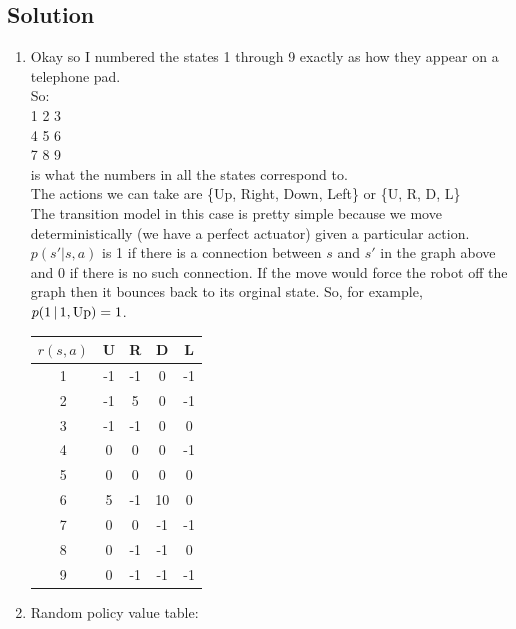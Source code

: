 \documentclass[submit]{harvardml}
\begin{document}
\subsection*{Solution}
\begin{enumerate}
\item 
Okay so I numbered the states 1 through 9 exactly as how they appear on a telephone pad.  \\
So: \\
1 2 3\\
4 5 6 \\
7 8 9 \\
is what the numbers in all the states correspond to.  \\
The actions we can take are \{Up, Right, Down, Left\} or \{U, R, D, L\} \\
The transition model in this case is pretty simple because we move deterministically (we have a perfect actuator) given a particular action. 
$p(s'|s,a)$ is 1 if there is a connection between $s$ and $s'$ in the graph above and 0 if there is no such connection.  If the move would force the robot off the graph then it bounces back to its orginal state. So, for example, $p(1 \,|\, 1, \textup{Up}) = 1$. \\
\begin{tabular}{c|c|c|c|c}
	$r(s,a)$ & U & R & D & L \\
	\hline
	1 & -1 & -1 &  0 & -1 \\
	2 & -1 &  5 &  0 & -1 \\
	3 & -1 & -1 &  0 &  0 \\
	4 &  0 &  0 &  0 & -1 \\
	5 &  0 &  0 &  0 &  0 \\
	6 &  5 & -1 & 10 &  0 \\
	7 &  0 &  0 & -1 & -1 \\
	8 &  0 & -1 & -1 &  0 \\
	9 &  0 & -1 & -1 & -1 \\
\end{tabular}

\item Random policy value table: \\


\end{enumerate}
\end{document}
